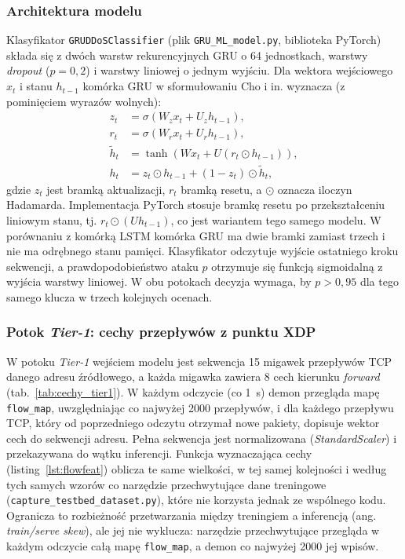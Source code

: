\documentclass[a4paper,12pt]{article}
\begin{document}
\subsubsection{Architektura modelu}\label{sec:gru_model}
Klasyfikator \texttt{GRUDDoSClassifier} (plik \texttt{GRU\_ML\_model.py}, biblioteka PyTorch) składa się z dwóch warstw rekurencyjnych GRU o 64 jednostkach, warstwy \textit{dropout} ($p=0{,}2$) i warstwy liniowej o jednym wyjściu. Dla wektora wejściowego $x_t$ i stanu $h_{t-1}$ komórka GRU w sformułowaniu Cho i in. \cite{cho2014learning} wyznacza (z pominięciem wyrazów wolnych):
\begin{align}
z_t &= \sigma\left(W_z x_t + U_z h_{t-1}\right), \\
r_t &= \sigma\left(W_r x_t + U_r h_{t-1}\right), \\
\tilde{h}_t &= \tanh\left(W x_t + U\left(r_t \odot h_{t-1}\right)\right), \\
h_t &= z_t \odot h_{t-1} + \left(1 - z_t\right) \odot \tilde{h}_t ,
\end{align}
gdzie $z_t$ jest bramką aktualizacji, $r_t$ bramką resetu, a $\odot$ oznacza iloczyn Hadamarda. Implementacja PyTorch stosuje bramkę resetu po przekształceniu liniowym stanu, tj. $r_t \odot (U h_{t-1})$, co jest wariantem tego samego modelu. W porównaniu z komórką LSTM \cite{hochreiter1997long} komórka GRU ma dwie bramki zamiast trzech i nie ma odrębnego stanu pamięci. Klasyfikator odczytuje wyjście ostatniego kroku sekwencji, a prawdopodobieństwo ataku $p$ otrzymuje się funkcją sigmoidalną z wyjścia warstwy liniowej. W obu potokach decyzja wymaga, by $p > 0{,}95$ dla tego samego klucza w trzech kolejnych ocenach.

\subsubsection{Potok \textit{Tier-1}: cechy przepływów z punktu XDP}\label{sec:gru_tier1}
W potoku \textit{Tier-1} wejściem modelu jest sekwencja 15 migawek przepływów TCP danego adresu źródłowego, a każda migawka zawiera 8 cech kierunku \textit{forward} (tab.~\ref{tab:cechy_tier1}). W każdym odczycie (co 1~s) demon przegląda mapę \texttt{flow\_map}, uwzględniając co najwyżej 2000 przepływów, i dla każdego przepływu TCP, który od poprzedniego odczytu otrzymał nowe pakiety, dopisuje wektor cech do sekwencji adresu. Pełna sekwencja jest normalizowana (\textit{StandardScaler}) i przekazywana do wątku inferencji. Funkcja wyznaczająca cechy (listing~\ref{lst:flowfeat}) oblicza te same wielkości, w tej samej kolejności i według tych samych wzorów co narzędzie przechwytujące dane treningowe (\texttt{capture\_testbed\_dataset.py}), które nie korzysta jednak ze wspólnego kodu. Ogranicza to rozbieżność przetwarzania między treningiem a inferencją (ang. \textit{train/serve skew}), ale jej nie wyklucza: narzędzie przechwytujące przegląda w każdym odczycie całą mapę \texttt{flow\_map}, a demon co najwyżej 2000 jej wpisów.
\end{document}
